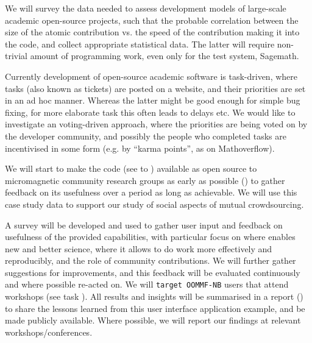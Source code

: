 \begin{workpackage}[id=social-aspects,wphases=1-48!.5,
  title=Social Aspects,
  lead=UO,
  UORM=1,USHRM=8, USORM=5]
\begin{tasklist}
\begin{task}[title=Survey and collection of needed data,id=datacollection]
We will survey the data needed to assess development models of 
large-scale academic open-source projects, 
such that the probable correlation between the size of the atomic contribution
vs. the speed of the contribution making it into the code, 
and collect appropriate statistical data. The latter will require non-trivial
amount of programming work, even only for the test system, Sagemath.
\end{task}

\begin{task}[title=Collective decision making in development,id=decisionmaking]
Currently development of open-source academic software is task-driven, where tasks (also
known as tickets) are posted on a website, and their priorities are set in an ad hoc manner.
Whereas the latter might be good enough for simple bug fixing, for more elaborate task this
often leads to delays etc.
We would like to investigate an voting-driven approach, where the priorities are being
voted on by the developer community, and possibly the people who completed tasks
are incentivised in some form (e.g. by ``karma points'', as on Mathoverflow).
\end{task}

\begin{task}[title=OOMMF case study: Evaluation]
  We will start to make the \OOMMFNB{} code (see
   to
  ) available as open
  source to micromagnetic community research groups as early as
  possible
  () to
  gather feedback on its usefulness over a period as long as
  achievable. We will use this case study data to support our study of
  social aspects of mutual crowdsourcing.

  A survey will be developed and used to gather user input and
  feedback on usefulness of the provided capabilities, with particular
  focus on where \OOMMFNB{} enables new and better science, where it
  allows to do work more effectively and reproducibly, and the role of
  community contributions. We will further gather suggestions for
  improvements, and this feedback will be evaluated continuously and
  where possible re-acted on. We will \texttt{target OOMMF-NB} users
  that attend workshops (see task
  ). All results
  and insights will be summarised in a report () to share the lessons
  learned from this user interface application example, and be made
  publicly available. Where possible, we will report our findings at
  relevant workshops/conferences.
\end{task}




\end{tasklist}
\end{workpackage}
